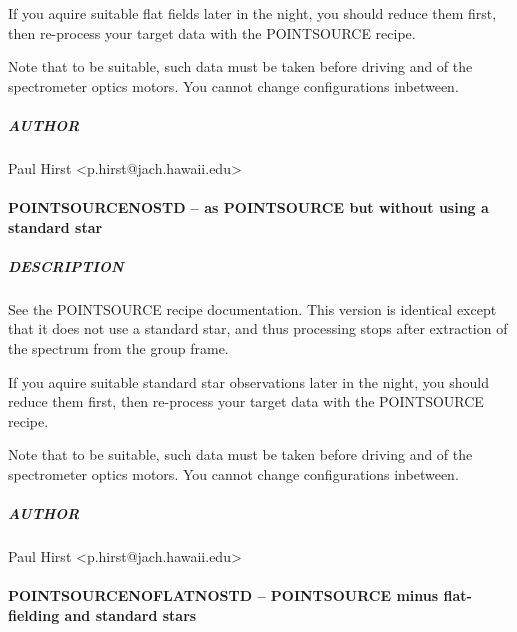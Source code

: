 \documentclass[twoside,11pt]{article}
\renewcommand{\_}{\texttt{\symbol{95}}}
\begin{document}
If you aquire suitable flat fields later in the night, you should
reduce them first, then re-process your target data with the
POINT\_SOURCE recipe.



Note that to be suitable, such data must be taken before driving and
of the spectrometer optics motors. You cannot change configurations
inbetween.

\subparagraph*{AUTHOR\label{POINT_SOURCE_NOFLAT_--_as_POINT_SOURCE_but_without_flat-fielding_AUTHOR}}

Paul Hirst <p.hirst@jach.hawaii.edu>

\paragraph*{POINT\_SOURCE\_NOSTD -- as POINT\_SOURCE but without using a standard star\label{POINT_SOURCE_NOSTD_--_as_POINT_SOURCE_but_without_using_a_standard_star}}



\subparagraph*{DESCRIPTION\label{POINT_SOURCE_NOSTD_--_as_POINT_SOURCE_but_without_using_a_standard_star_DESCRIPTION}}

See the POINT\_SOURCE recipe documentation. This version is identical
except that it does not use a standard star, and thus processing stops
after extraction of the spectrum from the group frame.



If you aquire suitable standard star observations later in the night,
you should reduce them first, then re-process your target data with
the POINT\_SOURCE recipe.



Note that to be suitable, such data must be taken before driving and
of the spectrometer optics motors. You cannot change configurations
inbetween.

\subparagraph*{AUTHOR\label{POINT_SOURCE_NOSTD_--_as_POINT_SOURCE_but_without_using_a_standard_star_AUTHOR}}

Paul Hirst <p.hirst@jach.hawaii.edu>

\paragraph*{POINT\_SOURCE\_NOFLAT\_NOSTD -- POINT\_SOURCE minus flat-fielding and standard stars\label{POINT_SOURCE_NOFLAT_NOSTD_--_POINT_SOURCE_minus_flat-fielding_and_standard_stars}}
\end{document}
